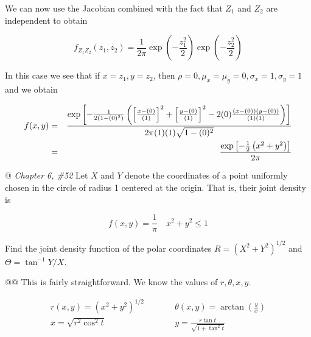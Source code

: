 \documentclass[11pt]{article}\usepackage[]{graphicx}\usepackage[]{xcolor}
\begin{document}
\begin{easylist}[enumerate]
    We can now use the Jacobian combined with the fact that $Z_1$ and $Z_2$ are independent to obtain

    \begin{equation}
        f_{Z_1Z_2}(z_1, z_2) =
            \frac{1}{2\pi} \exp\left({ -\frac{z_1^2}{2} }\right) \exp\left({ -\frac{z_2^2}{2} }\right)
    \end{equation}

    In this case we see that if $x=z_1, y=z_2$, then $\rho=0, \mu_x=\mu_y=0, \sigma_x=1, \sigma_y=1$ and we obtain

    \begin{equation}
        \begin{aligned}
            f(x, y) &=&
                \frac{%
                \exp \left[
                    - \frac{1}{2\left( 1 - (0)^2 \right)}
                    \left(
                        {\left[ \frac{x - (0)}{(1)} \right]}^2 +
                        {\left[ \frac{y - (0)}{(1)} \right]}^2 -
                        2 (0) \frac{(x - (0))(y - (0))}{(1)(1)}
                    \right)
                \right]}{2\pi (1) (1) \sqrt{1 - (0)^2}}\\
            &=& \frac{%
                \exp \left[
                    - \frac{1}{2}
                    \left(
                        x^2 + y^2
                    \right)
                \right]}{2\pi}
        \end{aligned}
    \end{equation}

    @ \textit{Chapter 6, \#52} Let $X$ and $Y$ denote the coordinates of a point uniformly chosen in the circle of
    radius 1 centered at the origin. That is, their joint density is

    \begin{equation}
        f(x, y) = \frac{1}{\pi} \quad x^2 + y^2 \le 1
    \end{equation}

    Find the joint density function of the polar coordinates $R = (X^2 + Y^2 )^{1/2}$ and $\Theta = \tan^{−1} Y/X$.

    @@ This is fairly straightforward. We know the values of $r, \theta, x, y$.

    \begin{equation}
        \begin{aligned}
            r(x, y) = {(x^2 + y^2)}^{1/2} &\qquad& \theta(x, y) = \arctan \left( \frac{y}{x} \right)\\
            x = \sqrt{r^2 \cos^2 t} &\qquad& y = \frac{r \tan t}{\sqrt{1 + \tan^2 t}}
        \end{aligned}
    \end{equation}


\end{easylist}
\end{document}
